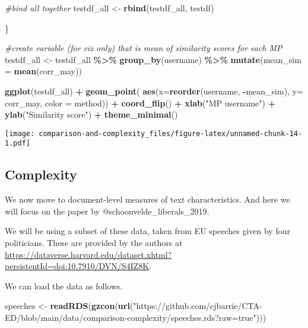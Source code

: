 \documentclass[
]{article}
\newenvironment{Shaded}{\begin{snugshade}}{\end{snugshade}}
\newcommand{\AttributeTok}[1]{\textcolor[rgb]{0.13,0.29,0.53}{#1}}
\newcommand{\CommentTok}[1]{\textcolor[rgb]{0.56,0.35,0.01}{\textit{#1}}}
\newcommand{\FunctionTok}[1]{\textcolor[rgb]{0.13,0.29,0.53}{\textbf{#1}}}
\newcommand{\NormalTok}[1]{#1}
\newcommand{\OtherTok}[1]{\textcolor[rgb]{0.56,0.35,0.01}{#1}}
\newcommand{\SpecialCharTok}[1]{\textcolor[rgb]{0.81,0.36,0.00}{\textbf{#1}}}
\newcommand{\StringTok}[1]{\textcolor[rgb]{0.31,0.60,0.02}{#1}}
\begin{document}
\begin{Shaded}
\begin{Highlighting}[]
  \CommentTok{\#bind all together}
\NormalTok{  testdf\_all }\OtherTok{\textless{}{-}} \FunctionTok{rbind}\NormalTok{(testdf\_all, testdf)  }
  
\NormalTok{\}}

\CommentTok{\#create variable (for viz only) that is mean of similarity scores for each MP}
\NormalTok{testdf\_all }\OtherTok{\textless{}{-}}\NormalTok{ testdf\_all }\SpecialCharTok{\%\textgreater{}\%}
  \FunctionTok{group\_by}\NormalTok{(username) }\SpecialCharTok{\%\textgreater{}\%}
  \FunctionTok{mutate}\NormalTok{(}\AttributeTok{mean\_sim =} \FunctionTok{mean}\NormalTok{(corr\_may))}

\FunctionTok{ggplot}\NormalTok{(testdf\_all) }\SpecialCharTok{+}
  \FunctionTok{geom\_point}\NormalTok{( }\FunctionTok{aes}\NormalTok{(}\AttributeTok{x=}\FunctionTok{reorder}\NormalTok{(username, }\SpecialCharTok{{-}}\NormalTok{mean\_sim), }\AttributeTok{y=}\NormalTok{ corr\_may, }\AttributeTok{color =}\NormalTok{ method)) }\SpecialCharTok{+} 
  \FunctionTok{coord\_flip}\NormalTok{() }\SpecialCharTok{+}
  \FunctionTok{xlab}\NormalTok{(}\StringTok{"MP username"}\NormalTok{) }\SpecialCharTok{+}
  \FunctionTok{ylab}\NormalTok{(}\StringTok{"Similarity score"}\NormalTok{) }\SpecialCharTok{+} 
  \FunctionTok{theme\_minimal}\NormalTok{()}
\end{Highlighting}
\end{Shaded}

\texttt{[image: comparison-and-complexity\_files/figure-latex/unnamed-chunk-14-1.pdf]}

\subsection{Complexity}\label{complexity}

We now move to document-level measures of text characteristics. And here
we will focus on the paper by @schoonvelde\_liberals\_2019.

We will be using a subset of these data, taken from EU speeches given by
four politicians. These are provided by the authors at
\url{https://dataverse.harvard.edu/dataset.xhtml?persistentId=doi:10.7910/DVN/S4IZ8K}.

We can load the data as follows.

\begin{Shaded}
\begin{Highlighting}[]
\NormalTok{speeches  }\OtherTok{\textless{}{-}} \FunctionTok{readRDS}\NormalTok{(}\FunctionTok{gzcon}\NormalTok{(}\FunctionTok{url}\NormalTok{(}\StringTok{"https://github.com/cjbarrie/CTA{-}ED/blob/main/data/comparison{-}complexity/speeches.rds?raw=true"}\NormalTok{)))}
\end{Highlighting}
\end{Shaded}
\end{document}
